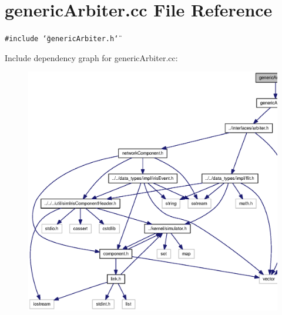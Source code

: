 \section{genericArbiter.cc File Reference}
\label{genericArbiter_8cc}
{\tt \#include \char`\"{}genericArbiter.h\char`\"{}}\par


Include dependency graph for genericArbiter.cc:\nopagebreak
\begin{figure}[H]
\begin{center}
\leavevmode
\includegraphics[width=328pt]{genericArbiter_8cc__incl}
\end{center}
\end{figure}
